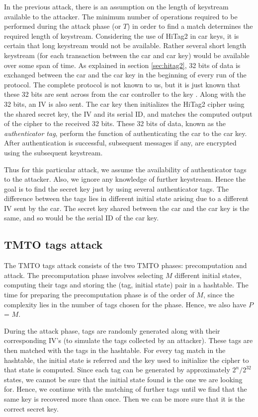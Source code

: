 In the previous attack, there is an assumption on the length of keystream available to the attacker. The minimum number of operations required to be performed during the attack phase (or $T$) in order to find a match determines the required length of keystream. Considering the use of HiTag2 in car keys, it is certain that long keystream would not be available. Rather several short length keystream (for each transaction between the car and car key) would be available over some span of time. As explained in section \ref{sec:hitag2}, 32 bits of data is exchanged between the car and the car key in the beginning of every run of the protocol. The complete protocol is not known to us, but it is just known that these 32 bits are sent across from the car controller to the key \cite{email-ruptor}. Along with the 32 bits, an IV is also sent. The car key then initializes the HiTag2 cipher using the shared secret key, the IV and its serial ID, and matches the computed output of the cipher to the received 32 bits. These 32 bits of data, known as the \emph{authenticator tag}, perform the function of authenticating the car to the car key. After authentication is successful, subsequent messages if any, are encrypted using the subsequent keystream.

Thus for this particular attack, we assume the availability of authenticator tags to the attacker. Also, we ignore any knowledge of further keystream. Hence the goal is to find the secret key just by using several authenticator tags. The difference between the tags lies in different initial state arising due to a different IV sent by the car. The secret key shared between the car and the car key is the same, and so would be the serial ID of the car key.

\subsection{TMTO tags attack}

The TMTO tags attack consists of the two TMTO phases: precomputation and attack. The precomputation phase involves selecting $M$ different initial states, computing their tags and storing the (tag, initial state) pair in a hashtable. The time for preparing the precomputation phase is of the order of $M$, since the complexity lies in the number of tags chosen for the phase. Hence, we also have $P$ = $M$.

During the attack phase, tags are randomly generated along with their corresponding IV's (to simulate the tags collected by an attacker). These tags are then matched with the tags in the hashtable. For every tag match in the hashtable, the initial state is referred and the key used to initialize the cipher to that state is computed. Since each tag can be generated by approximately $2^n/2^{32}$ states, we cannot be sure that the initial state found is the one we are looking for. Hence, we continue with the matching of further tags until we find that the same key is recovered more than once. Then we can be more sure that it is the correct secret key.\\


